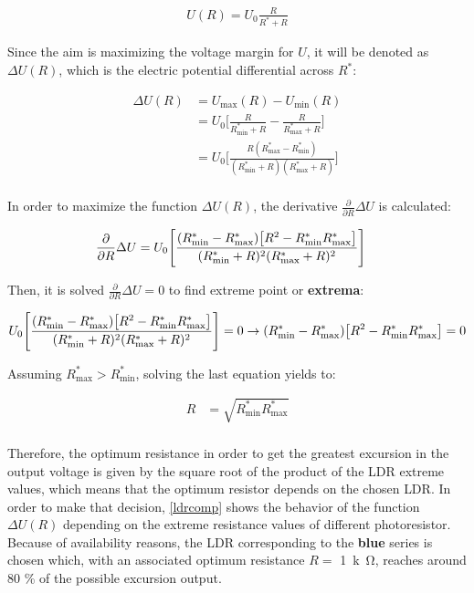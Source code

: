 \begin{align*}
U(R)=U_0 \frac{R}{R^* + R}
\end{align*}

Since the aim is maximizing the voltage margin for $U$, it will be denoted as $\Delta U(R)$, which is the electric potential differential across $R^*$:

\begin{align*}
\Delta U(R) &= U_{\text{max}}(R) - U_{\text{min}}(R) \\
&= U_0 \Bigg[\frac{R}{R^*_{\text{min}} + R} - \frac{R}{R^*_{\text{max}} + R} \Bigg] \\
&= U_0 \Bigg[\frac{R(R^*_{\text{max}} - R^*_{\text{min}})}{(R^*_{\text{min}} + R)(R^*_{\text{max}} + R)} \Bigg] \\
\end{align*}


In order to maximize the function $\Delta U(R)$, the derivative $\frac{\partial}{\partial R} \Delta U $ is calculated:

\begin{align*}
\centering
\frac{\partial}{\partial R} \Delta U &= U_0\Bigg[\frac{(R^*_{\text{min}} - R^*_{\text{max}})\big[R^2-R^*_{\text{min}}R^*_{\text{max}}\big]}{(R^*_{\text{min}} + R)^2(R^*_{\text{max}} + R)^2}\Bigg]
\end{align*} %

Then, it is solved $\frac{\partial}{\partial R} \Delta U = 0$ to find extreme point or \textbf{extrema}:

\begin{align*}
\centering
U_0\Bigg[\frac{(R^*_{\text{min}} - R^*_{\text{max}})\big[R^2-R^*_{\text{min}}R^*_{\text{max}}\big]}{(R^*_{\text{min}} + R)^2(R^*_{\text{max}} + R)^2}\Bigg] =  0 \rightarrow 
(R^*_{\text{min}} - R^*_{\text{max}})\big[R^2-R^*_{\text{min}}R^*_{\text{max}}\big] =  0
\end{align*} %

Assuming $R^*_{\text{max}}>R^*_{\text{min}}$, solving the last equation yields to:

\begin{align*}
R &= \sqrt{R^*_{\text{min}}R^*_{\text{max}}} \\
\end{align*} %


Therefore, the optimum resistance in order to get the greatest excursion in the output voltage is given by the square root of the product of the  \acrshort{LDR} extreme values, which means that the optimum resistor depends on the chosen \acrshort{LDR}. In order to make that decision, \autoref{ldrcomp} shows the behavior of the function $\Delta U(R)$ depending on the extreme resistance values of different photoresistor. Because of availability reasons, the \acrshort{LDR} corresponding to the \textbf{blue} series is chosen which, with an associated optimum resistance $ R = $ \SI{1}{k\ohm}, reaches around 80 \% of the possible excursion output.
		

